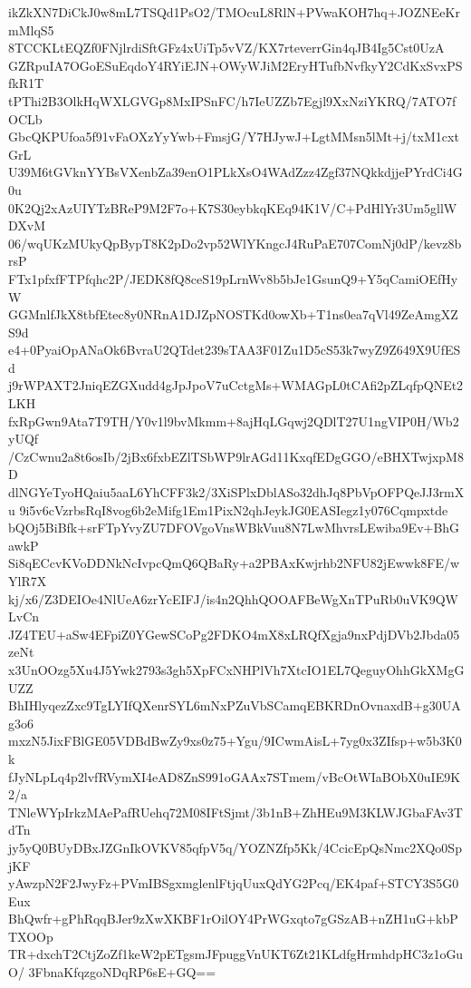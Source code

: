 ikZkXN7DiCkJ0w8mL7TSQd1PsO2/TMOcuL8RlN+PVwaKOH7hq+JOZNEeKrmMlqS5
8TCCKLtEQZf0FNjlrdiSftGFz4xUiTp5vVZ/KX7rteverrGin4qJB4Ig5Cst0UzA
GZRpuIA7OGoESuEqdoY4RYiEJN+OWyWJiM2EryHTufbNvfkyY2CdKxSvxPSfkR1T
tPThi2B3OlkHqWXLGVGp8MxIPSnFC/h7IeUZZb7Egjl9XxNziYKRQ/7ATO7fOCLb
GbcQKPUfoa5f91vFaOXzYyYwb+FmsjG/Y7HJywJ+LgtMMsn5lMt+j/txM1cxtGrL
U39M6tGVknYYBsVXenbZa39enO1PLkXsO4WAdZzz4Zgf37NQkkdjjePYrdCi4G0u
0K2Qj2xAzUIYTzBReP9M2F7o+K7S30eybkqKEq94K1V/C+PdHlYr3Um5gllWDXvM
06/wqUKzMUkyQpBypT8K2pDo2vp52WlYKngcJ4RuPaE707ComNj0dP/kevz8brsP
FTx1pfxfFTPfqhc2P/JEDK8fQ8ceS19pLrnWv8b5bJe1GsunQ9+Y5qCamiOEfHyW
GGMnlfJkX8tbfEtec8y0NRnA1DJZpNOSTKd0owXb+T1ns0ea7qVl49ZeAmgXZS9d
e4+0PyaiOpANaOk6BvraU2QTdet239sTAA3F01Zu1D5cS53k7wyZ9Z649X9UfESd
j9rWPAXT2JniqEZGXudd4gJpJpoV7uCctgMs+WMAGpL0tCAfi2pZLqfpQNEt2LKH
fxRpGwn9Ata7T9TH/Y0v1l9bvMkmm+8ajHqLGqwj2QDlT27U1ngVIP0H/Wb2yUQf
/CzCwnu2a8t6osIb/2jBx6fxbEZlTSbWP9lrAGd11KxqfEDgGGO/eBHXTwjxpM8D
dlNGYeTyoHQaiu5aaL6YhCFF3k2/3XiSPlxDblASo32dhJq8PbVpOFPQeJJ3rmXu
9i5v6cVzrbsRqI8vog6b2eMifg1Em1PixN2qhJeykJG0EASIegz1y076Cqmpxtde
bQOj5BiBfk+srFTpYvyZU7DFOVgoVnsWBkVuu8N7LwMhvrsLEwiba9Ev+BhGawkP
Si8qECcvKVoDDNkNcIvpcQmQ6QBaRy+a2PBAxKwjrhb2NFU82jEwwk8FE/wYlR7X
kj/x6/Z3DEIOe4NlUeA6zrYcEIFJ/is4n2QhhQOOAFBeWgXnTPuRb0uVK9QWLvCn
JZ4TEU+aSw4EFpiZ0YGewSCoPg2FDKO4mX8xLRQfXgja9nxPdjDVb2Jbda05zeNt
x3UnOOzg5Xu4J5Ywk2793s3gh5XpFCxNHPlVh7XtcIO1EL7QeguyOhhGkXMgGUZZ
BhIHlyqezZxc9TgLYIfQXenrSYL6mNxPZuVbSCamqEBKRDnOvnaxdB+g30UAg3o6
mxzN5JixFBlGE05VDBdBwZy9xs0z75+Ygu/9ICwmAisL+7yg0x3ZIfsp+w5b3K0k
fJyNLpLq4p2lvfRVymXI4eAD8ZnS991oGAAx7STmem/vBcOtWIaBObX0uIE9K2/a
TNleWYpIrkzMAePafRUehq72M08IFtSjmt/3b1nB+ZhHEu9M3KLWJGbaFAv3TdTn
jy5yQ0BUyDBxJZGnIkOVKV85qfpV5q/YOZNZfp5Kk/4CcicEpQsNmc2XQo0SpjKF
yAwzpN2F2JwyFz+PVmIBSgxmglenlFtjqUuxQdYG2Pcq/EK4paf+STCY3S5G0Eux
BhQwfr+gPhRqqBJer9zXwXKBF1rOilOY4PrWGxqto7gGSzAB+nZH1uG+kbPTXOOp
TR+dxchT2CtjZoZf1keW2pETgsmJFpuggVnUKT6Zt21KLdfgHrmhdpHC3z1oGuO/
3FbnaKfqzgoNDqRP6sE+GQ==
